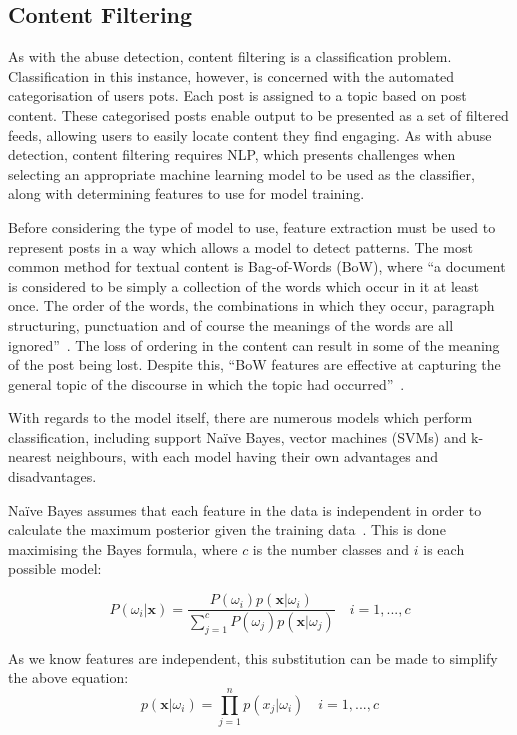 \subsection{Content Filtering} \label{sec:research-content-filtering}
As with the abuse detection, content filtering is a classification problem. Classification in this instance, however, is concerned with the automated categorisation of users pots. Each post is assigned to a topic based on post content. These categorised posts enable output to be presented as a set of filtered feeds, allowing users to easily locate content they find engaging. As with abuse detection, content filtering requires NLP, which presents challenges when selecting an appropriate machine learning model to be used as the classifier, along with determining features to use for model training.

Before considering the type of model to use, feature extraction must be used to represent posts in a way which allows a model to detect patterns. The most common method for textual content is Bag-of-Words (BoW), where ``a document is considered to be simply a collection of the words which occur in it at least once. The order of the words, the combinations in which they occur, paragraph structuring, punctuation and of course the meanings of the words are all ignored''~\cite{Bramer:BoW}. The loss of ordering in the content can result in some of the meaning of the post being lost. Despite this, ``BoW features are effective at capturing the general topic of the discourse in which the topic had occurred''~\cite{Jurafsky:BoW}.

With regards to the model itself, there are numerous models which perform classification, including support Na\"ive Bayes, vector machines (SVMs) and k-nearest neighbours, with each model having their own advantages and disadvantages.

Na\"ive Bayes assumes that each feature in the data is independent in order to calculate the maximum posterior given the training data~\cite{Kuncheva:Bayes}. This is done maximising the Bayes formula, where $c$ is the number classes and $i$ is each possible model:

\begin{equation}
\label{eq:bayes}
P(\omega_{i}|\mathbf{x}) = \frac{P(\omega_{i})p(\mathbf{x}|\omega_{i})}{\sum_{j=1}^{c}P(\omega_{j})p(\mathbf{x}|\omega_{j})}\quad i=1,...,c
\end{equation}

\noindent As we know features are independent, this substitution can be made to simplify the above equation:  
\begin{equation}
\label{eq:bayes-simple}
p(\mathbf{x}|\omega_{i})=\prod_{j=1}^{n}p(x_{j}|\omega_{i})\quad i=1,...,c
\end{equation}

